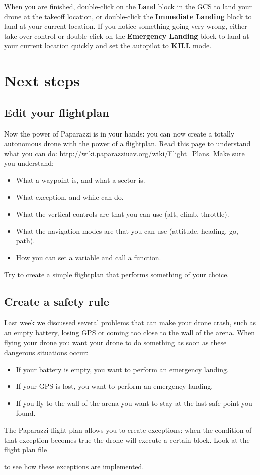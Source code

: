 When you are finished, double-click on the \textbf{Land} block in the GCS to land your drone at the takeoff location, or double-click the \textbf{Immediate Landing} block to land at your current location. If you notice something going very wrong, either take over control or double-click on the \textbf{Emergency Landing} block to land at your current location quickly and set the autopilot to \textbf{KILL} mode.

\section{Next steps}
\subsection*{Edit your flightplan}
Now the power of Paparazzi is in your hands: you can now create a totally autonomous drone with the power of a flightplan. Read this page to understand what you can do: \url{http://wiki.paparazziuav.org/wiki/Flight_Plans}. 
Make sure you understand:
\begin{itemize}
	\item What a waypoint is, and what a sector is. 
	\item What exception, and while can do. 
	\item What the vertical controls are that you can use (alt, climb, throttle).
	\item What the navigation modes are that you can use (attitude, heading, go, path). 
	\item How you can set a variable and call a function. 
\end{itemize}

Try to create a simple flightplan that performs something of your choice. 

\subsection*{Create a safety rule}
Last week we discussed several problems that can make your drone crash, such as an empty battery, losing GPS or coming too close to the wall of the arena.
When flying your drone you want your drone to do something as soon as these dangerous situations occur:
\begin{itemize}
	\item If your battery is empty, you want to perform an emergency landing.
	\item If your GPS is lost, you want to perform an emergency landing.
	\item If you fly to the wall of the arena you want to stay at the last safe point you found. 
\end{itemize}
The Paparazzi flight plan allows you to create exceptions: when the condition of that exception becomes true the drone will execute a certain block. Look at the flight plan file 

 to see how these exceptions are implemented. 
